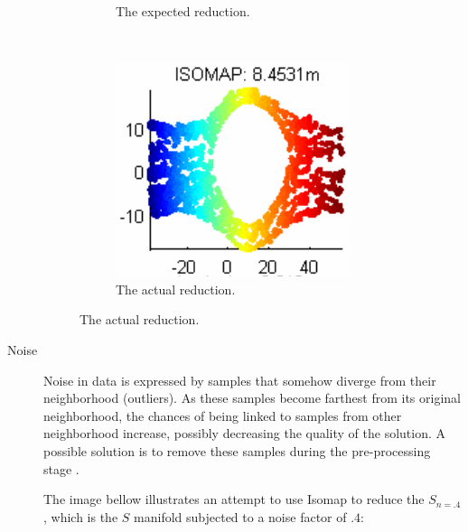 \documentclass[12pt]{article}
\begin{document}
\begin{description}
\begin{figure}[H]
\begin{subfigure}[H]{.3\linewidth}
				\captionsetup{justification=centering}
				\caption{The expected reduction.}
			\end{subfigure}
			~
			\begin{subfigure}[H]{.3\linewidth}
				\includegraphics[width=\linewidth]{img/convexity/actual.png}
				\captionsetup{justification=centering}
				\caption{The actual reduction.}
			\end{subfigure}
		\end{figure}

	\item[Noise] Noise in data is expressed by samples that somehow diverge from their neighborhood (outliers). As these samples become farthest from its original neighborhood, the chances of being linked to samples from other neighborhood increase, possibly decreasing the quality of the solution. A possible solution is to remove these samples during the pre-processing stage \cite{herik2009}.

	The image bellow illustrates an attempt to use Isomap to reduce the $S_{n=.4}$, which is the $S$ manifold subjected to a noise factor of $.4$:


\end{description}
\end{document}
